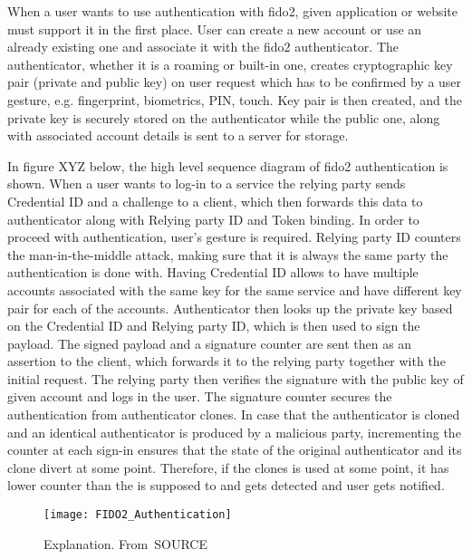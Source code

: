 When a user wants to use authentication with \acrshort{fido}2, given application or website must support it in the first place. User can create a new account or use an already existing one and associate it with the \acrshort{fido}2 authenticator. The authenticator, whether it is a roaming or built-in one, creates cryptographic key pair (private and public key) on user request which has to be confirmed by a user gesture, e.g. fingerprint, biometrics, PIN, touch. Key pair is then created, and the private key is securely stored on the authenticator while the public one, along with associated account details is sent to a server for storage.

In figure XYZ below, the high level sequence diagram of \acrshort{fido}2 authentication is shown. When a user wants to log-in to a service the relying party sends Credential ID and a challenge to a client, which then forwards this data to authenticator along with Relying party ID and Token binding. In order to proceed with authentication, user's gesture is required. Relying party ID counters the man-in-the-middle attack, making sure that it is always the same party the authentication is done with. Having Credential ID allows to have multiple accounts associated with the same key for the same service and have different key pair for each of the accounts. Authenticator then looks up the private key based on the Credential ID and Relying party ID, which is then used to sign the payload. The signed payload and a signature counter are sent then as an assertion to the client, which forwards it to the relying party together with the initial request. The relying party then verifies the signature with the public key of given account and logs in the user. The signature counter secures the authentication from authenticator clones. In case that the authenticator is cloned and an identical authenticator is produced by a malicious party, incrementing the counter at each sign-in ensures that the state of the original authenticator and its clone divert at some point. Therefore, if the clones is used at some point, it has lower counter than the is supposed to and gets detected and user gets notified.

\begin{figure}[ht]
    \centering
    \texttt{[image: FIDO2\_Authentication]}
    \caption{Explanation. From~\cite{}SOURCE}
    \label{fig:fido2_authentication}
\end{figure}